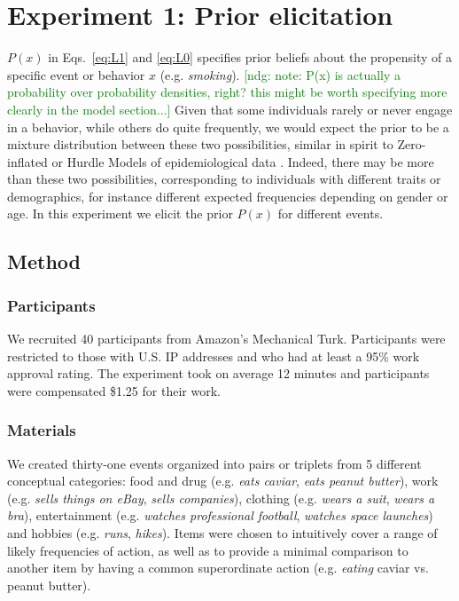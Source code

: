 \documentclass[10pt,letterpaper]{article}
\newcommand{\ndg}[1]{\textcolor{Green}{[ndg: #1]}}
\begin{document}
\section{Experiment 1: Prior elicitation}

%
$P(x)$ in Eqs.~\ref{eq:L1} and \ref{eq:L0} specifies prior beliefs about the propensity of a specific event or behavior $x$  (e.g. \emph{smoking}).
\ndg{note: P(x) is actually a probability over probability densities, right? this might be worth specifying more clearly in the model section...}
Given that some individuals rarely or never engage in a behavior, while others do quite frequently, we would expect the prior to be a mixture distribution between these two possibilities, similar in spirit to Zero-inflated or Hurdle Models of epidemiological data \cite{hurdleModels}.
Indeed, there may be more than these two possibilities, corresponding to individuals with different traits or demographics, for instance different expected frequencies depending on gender or age. 
In this experiment we elicit the prior $P(x)$ for different events.

\subsection{Method}

\subsubsection{Participants}
We recruited 40 participants from Amazon's Mechanical Turk.
Participants were restricted to those with U.S. IP addresses and who had at least a 95\% work approval rating.
The experiment took on average 12 minutes and participants were compensated \$1.25 for their work.

\subsubsection{Materials}

We created thirty-one events organized into pairs or triplets from 5 different conceptual categories: food and drug (e.g. \emph{eats caviar}, \emph{eats peanut butter}), work (e.g. \emph{sells things on eBay}, \emph{sells companies}), clothing (e.g. \emph{wears a suit}, \emph{wears a bra}), entertainment (e.g. \emph{watches professional football}, \emph{watches space launches}) and hobbies (e.g. \emph{runs}, \emph{hikes}). 
Items were chosen to intuitively cover a range of likely frequencies of action, as well as to provide a minimal comparison to another item by having a common superordinate action (e.g. \emph{eating} caviar vs. peanut butter).
\end{document}
